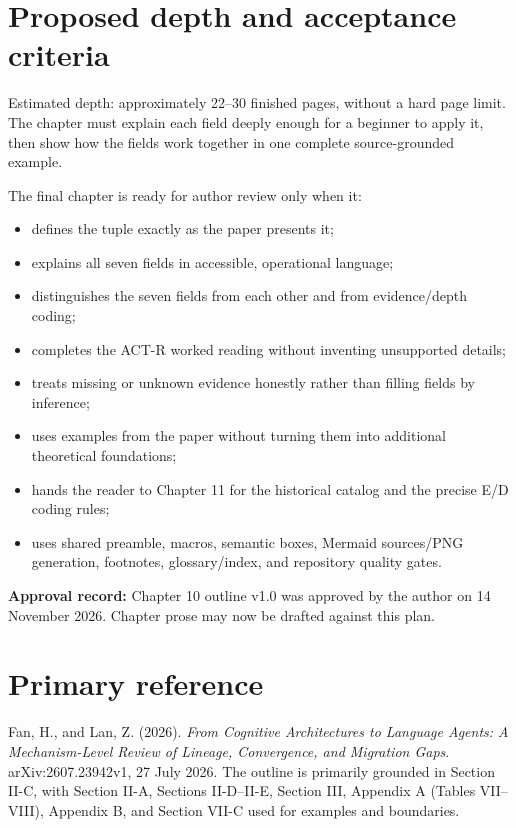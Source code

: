 \section{Proposed depth and acceptance criteria}
Estimated depth: approximately 22--30 finished pages, without a hard page limit. The chapter must explain each field deeply enough for a beginner to apply it, then show how the fields work together in one complete source-grounded example.

The final chapter is ready for author review only when it:
\begin{itemize}
  \item defines the tuple exactly as the paper presents it;
  \item explains all seven fields in accessible, operational language;
  \item distinguishes the seven fields from each other and from evidence/depth coding;
  \item completes the ACT-R worked reading without inventing unsupported details;
  \item treats missing or unknown evidence honestly rather than filling fields by inference;
  \item uses examples from the paper without turning them into additional theoretical foundations;
  \item hands the reader to Chapter 11 for the historical catalog and the precise E/D coding rules;
  \item uses shared preamble, macros, semantic boxes, Mermaid sources/PNG generation, footnotes, glossary/index, and repository quality gates.
\end{itemize}

\begin{warningbox}
\textbf{Approval record:} Chapter 10 outline v1.0 was approved by the author on 14 November 2026. Chapter prose may now be drafted against this plan.
\end{warningbox}

\section*{Primary reference}
Fan, H., and Lan, Z. (2026). \emph{From Cognitive Architectures to Language Agents: A Mechanism-Level Review of Lineage, Convergence, and Migration Gaps}. arXiv:2607.23942v1, 27 July 2026. The outline is primarily grounded in Section II-C, with Section II-A, Sections II-D--II-E, Section III, Appendix A (Tables VII--VIII), Appendix B, and Section VII-C used for examples and boundaries.

